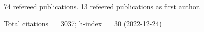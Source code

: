 74 refereed publications. 13 refeered publications as first author.

Total citations~=~3037; h-index~=~30 (2022-12-24)